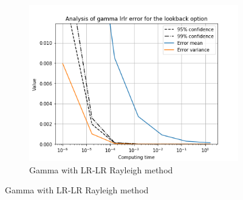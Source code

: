 \documentclass[11pt,a4paper,fleqn]{article}
\begin{document}
\begin{figure}[h!]
\begin{subfigure}[b]{0.3\textwidth}
          \includegraphics[width=\textwidth]{graphs/lookbackgammalrlrtime.png}
          \caption{Gamma with LR-LR Rayleigh method}
      \end{subfigure}


\end{figure}
\end{document}
